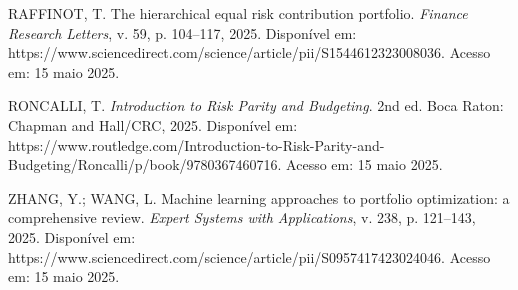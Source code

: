 \begin{thebibliography}{99}
RAFFINOT, T. The hierarchical equal risk contribution portfolio. \textit{Finance Research Letters}, v. 59, p. 104--117, 2025. Disponível em: https://www.sciencedirect.com/science/article/pii/S1544612323008036. Acesso em: 15 maio 2025.

RONCALLI, T. \textit{Introduction to Risk Parity and Budgeting}. 2nd ed. Boca Raton: Chapman and Hall/CRC, 2025. Disponível em: https://www.routledge.com/Introduction-to-Risk-Parity-and-Budgeting/Roncalli/p/book/9780367460716. Acesso em: 15 maio 2025.

ZHANG, Y.; WANG, L. Machine learning approaches to portfolio optimization: a comprehensive review. \textit{Expert Systems with Applications}, v. 238, p. 121--143, 2025. Disponível em: https://www.sciencedirect.com/science/article/pii/S0957417423024046. Acesso em: 15 maio 2025.

\end{thebibliography}